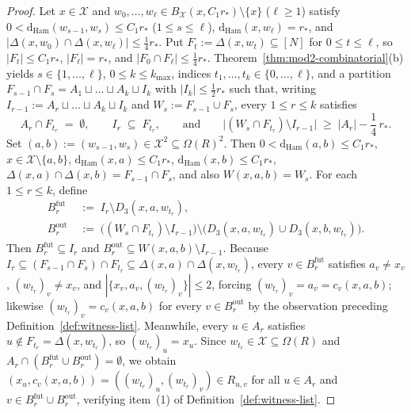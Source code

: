 \documentclass[11pt]{article}
\theoremstyle{definition}
\theoremstyle{remark}
\newcommand{\Ham}{\mathrm{Ham}}
\newcommand{\dHam}{\mathrm{d}_{\Ham}}
\begin{document}
\begin{proof}
Let $x \in \mathcal{X}$ and $w_0, \dots, w_\ell \in B_{\mathcal{X}}(x, C_1 r_*) \setminus \{x\}$ ($\ell \ge 1$) satisfy $0 < \dHam(w_{s-1}, w_s) \le C_1 r_*$ ($1 \le s \le \ell$), $\dHam(x, w_\ell) = r_*$, and $|\Delta(x, w_0) \cap \Delta(x, w_\ell)| \le \frac{1}{4} r_*$. Put $F_t := \Delta(x, w_t) \subseteq [N]$ for $0 \le t \le \ell$, so $|F_t| \le C_1 r_*$, $|F_\ell| = r_*$, and $|F_0 \cap F_\ell| \le \frac{1}{4} r_*$. Theorem~\ref{thm:mod2-combinatorial}(b) yields $s \in \{1, \dots, \ell\}$, $0 \le k \le k_{\max}$, indices $t_1, \dots, t_k \in \{0, \dots, \ell\}$, and a partition $F_{s-1} \cap F_s = A_1 \sqcup \dots \sqcup A_k \sqcup I_k$ with $|I_k| \le \frac{1}{2} r_*$ such that, writing $I_{r-1} := A_r \sqcup \dots \sqcup A_k \sqcup I_k$ and $W_s := F_{s-1} \cup F_s$, every $1 \le r \le k$ satisfies
\begin{equation}
\label{eq:hit-pretrim}
A_r \cap F_{t_r} \;=\; \emptyset, \qquad I_r \;\subseteq\; F_{t_r}, \qquad \text{and} \qquad \bigl|(W_s \cap F_{t_r}) \setminus I_{r-1}\bigr| \;\ge\; |A_r| - \frac{1}{4}\,r_*.
\end{equation}
Set $(a, b) := (w_{s-1}, w_s) \in \mathcal{X}^2 \subseteq \Omega(R)^2$. Then $0 < \dHam(a, b) \le C_1 r_*$, $x \in \mathcal{X} \setminus \{a, b\}$, $\dHam(x, a) \le C_1 r_*$, $\dHam(x, b) \le C_1 r_*$, $\Delta(x, a) \cap \Delta(x, b) = F_{s-1} \cap F_s$, and also $W(x, a, b) = W_s$. For each $1 \le r \le k$, define
\begin{align*}
B_r^{\mathrm{fut}} &\;:=\; I_r \setminus D_3(x, a, w_{t_r}), \\
B_r^{\mathrm{out}} &\;:=\; \bigl((W_s \cap F_{t_r}) \setminus I_{r-1}\bigr) \setminus \bigl(D_3(x, a, w_{t_r}) \cup D_3(x, b, w_{t_r})\bigr).
\end{align*}
Then $B_r^{\mathrm{fut}} \subseteq I_r$ and $B_r^{\mathrm{out}} \subseteq W(x, a, b) \setminus I_{r-1}$. Because $I_r \subseteq (F_{s-1} \cap F_s) \cap F_{t_r} \subseteq \Delta(x, a) \cap \Delta(x, w_{t_r})$, every $v \in B_r^{\mathrm{fut}}$ satisfies $a_v \ne x_v$, $(w_{t_r})_v \ne x_v$, and $|\{x_v, a_v, (w_{t_r})_v\}| \le 2$, forcing $(w_{t_r})_v = a_v = c_v(x, a, b)$; likewise $(w_{t_r})_v = c_v(x, a, b)$ for every $v \in B_r^{\mathrm{out}}$ by the observation preceding Definition~\ref{def:witness-list}. Meanwhile, every $u \in A_r$ satisfies $u \notin F_{t_r} = \Delta(x, w_{t_r})$, so $(w_{t_r})_u = x_u$. Since $w_{t_r} \in \mathcal{X} \subseteq \Omega(R)$ and $A_r \cap (B_r^{\mathrm{fut}} \cup B_r^{\mathrm{out}}) = \emptyset$, we obtain $(x_u, c_v(x, a, b)) = ((w_{t_r})_u, (w_{t_r})_v) \in R_{u, v}$ for all $u \in A_r$ and $v \in B_r^{\mathrm{fut}} \cup B_r^{\mathrm{out}}$, verifying item~(1) of Definition~\ref{def:witness-list}.


\end{proof}
\end{document}
